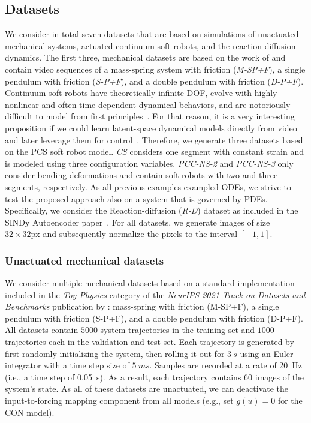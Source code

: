 \subsection{Datasets} 
We consider in total seven datasets that are based on simulations of unactuated mechanical systems, actuated continuum soft robots, and the reaction-diffusion dynamics. The first three, mechanical datasets are based on the work of \citet{botev2021priors} and contain video sequences of a mass-spring system with friction (\emph{M-SP+F}), a single pendulum with friction (\emph{S-P+F}), and a double pendulum with friction (\emph{D-P+F}).
Continuum soft robots have theoretically infinite \gls{DOF}, evolve with highly nonlinear and often time-dependent dynamical behaviors, and are notoriously difficult to model from first principles~\citep{armanini2023soft}. For that reason, it is a very interesting proposition if we could learn latent-space dynamical models directly from video~\citep{thuruthel2023multi} and later leverage them for control~\citep{almanzor2023static}. 
Therefore, we generate three datasets based on the \gls{PCS} soft robot model. \emph{CS} considers one segment with constant strain and is modeled using three configuration variables. \emph{PCC-NS-2} and \emph{PCC-NS-3} only consider bending deformations and contain soft robots with two and three segments, respectively. 
As all previous examples exampled \glspl{ODE}, we strive to test the proposed approach also on a system that is governed by \glspl{PDE}. Specifically, we consider the Reaction-diffusion (\emph{R-D}) dataset as included in the SINDy Autoencoder paper~\citep{champion2019data}.
For all datasets, we generate images of size $32 \times 32 \mathrm{px}$ and subsequently normalize the pixels to the interval $[-1, 1]$. 

\subsubsection{Unactuated mechanical datasets}
We consider multiple mechanical datasets based on a standard implementation included in the \emph{Toy Physics} category of the \emph{NeurIPS 2021 Track on Datasets and Benchmarks} publication by \citet{botev2021priors}:  mass-spring with friction (M-SP+F), a single pendulum with friction (S-P+F), and a double pendulum with friction (D-P+F).
All datasets contain $5000$ system trajectories in the training set and $1000$ trajectories each in the validation and test set.
Each trajectory is generated by first randomly initializing the system, then rolling it out for $\SI{3}{s}$ using an Euler integrator with a time step size of $\SI{5}{ms}$. Samples are recorded at a rate of \SI{20}{Hz}  (i.e., a time step of \SI{0.05}{s}). As a result, each trajectory contains $60$ images of the system's state.
As all of these datasets are unactuated, we can deactivate the input-to-forcing mapping component from all models (e.g., set $g(u) = 0$ for the \gls{CON} model).

